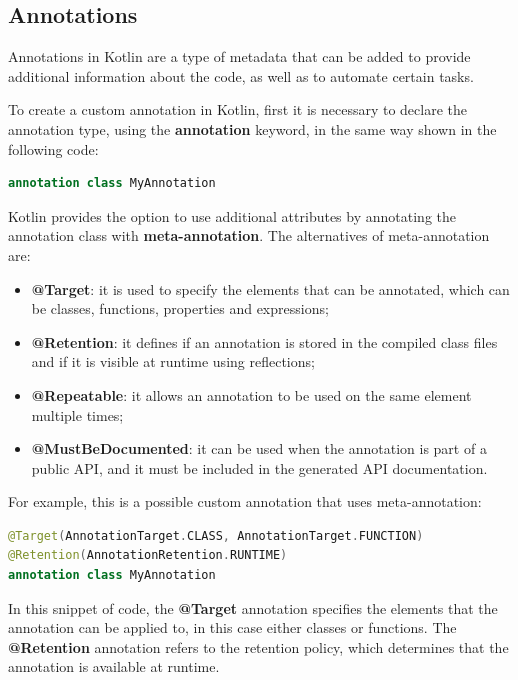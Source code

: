\subsection{Annotations}
Annotations \cite{annotation_documentation} in Kotlin are a type of metadata that can be added to provide additional information about the code, as well as to automate certain tasks.

To create a custom annotation in Kotlin, first it is necessary to declare the annotation type, using the \textbf{annotation} keyword, in the same way shown in the following code:
\begin{lstlisting}[caption={Example of creation of a custom annotation in Kotlin}, language=Kotlin, captionpos=b, label={code:kotlin_annotations_creation}]
annotation class MyAnnotation
\end{lstlisting}

Kotlin provides the option to use additional attributes by annotating the annotation class with \textbf{meta-annotation}. The alternatives of meta-annotation are:
\begin{itemize}
    \item \textbf{@Target}: it is used to specify the elements that can be annotated, which can be classes, functions, properties and expressions;
    \item \textbf{@Retention}: it defines if an annotation is stored in the compiled class files and if it is visible at runtime using reflections;
    \item \textbf{@Repeatable}: it allows an annotation to be used on the same element multiple times;
    \item \textbf{@MustBeDocumented}: it can be used when the annotation is part of a public API, and it must be included in the generated API documentation.
\end{itemize}

For example, this is a possible custom annotation that uses meta-annotation:
\begin{lstlisting}[caption={Example of custom annotation in Kotlin}, language=Kotlin, captionpos=b, label={code:kotlin_annotations_customization}]
@Target(AnnotationTarget.CLASS, AnnotationTarget.FUNCTION)
@Retention(AnnotationRetention.RUNTIME)
annotation class MyAnnotation
\end{lstlisting}
In this snippet of code, the \textbf{@Target} annotation specifies the elements that the annotation can be applied to, in this case either classes or functions. The \textbf{@Retention} annotation refers to the retention policy, which determines that the annotation is available at runtime.

